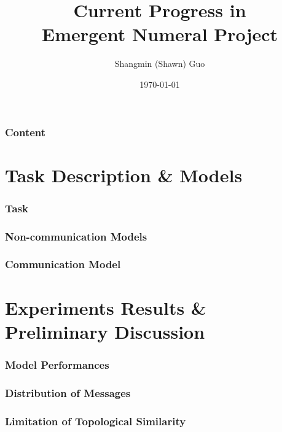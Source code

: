 \documentclass[compress,mathserif,xcolor=dvipsnames,svgnames,aspectratio=43]{beamer}
\begin{document}
\title{\huge{Current Progress in \\ Emergent Numeral Project}\\\medskip
    \large\textcolor{beautyblue}{} \medskip}
\author[{Shangmin (Shawn) Guo}]{\textcolor{grizoo}{Shangmin (Shawn) Guo}}
\date[someday\ldots]{\today}%

\begin{frame}
\titlepage
\end{frame}

\begin{frame}
\frametitle{Content}
\tableofcontents
\end{frame}

\section{Task Description \& Models}

\begin{frame}[c]
  \frametitle{Task}
\end{frame}

\begin{frame}[c]
  \frametitle{Non-communication Models}

\end{frame}

\begin{frame}[c]
  \frametitle{Communication Model}
\end{frame}

\section{Experiments Results \& Preliminary Discussion}

\begin{frame}[c]
  \frametitle{Model Performances}
  
\end{frame}

\begin{frame}[c]
  \frametitle{Distribution of Messages}
  
\end{frame}

\begin{frame}[c]
  \frametitle{Limitation of Topological Similarity}
  
\end{frame}
\end{document}

